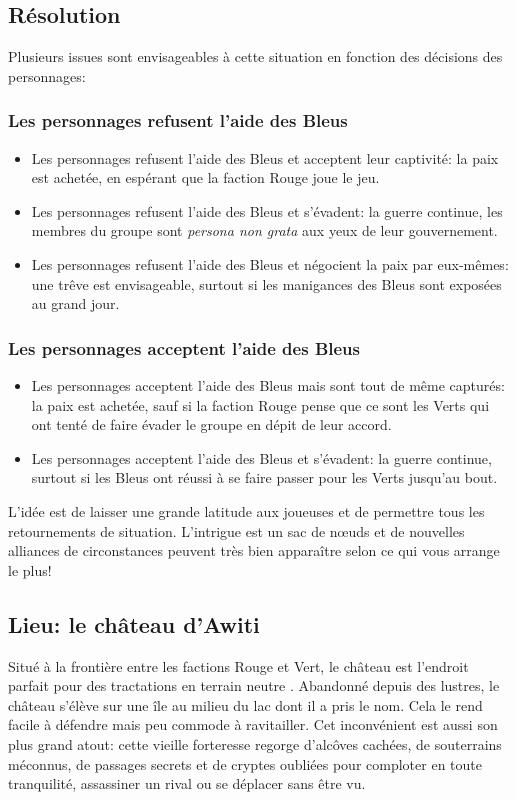 \subsection{Résolution}

Plusieurs issues sont envisageables à cette situation en fonction des décisions des personnages:

\subsubsection{Les personnages refusent l'aide des Bleus}
\begin{itemize}
	\item Les personnages refusent l'aide des Bleus et acceptent leur captivité: la paix est achetée, en espérant que la faction Rouge joue le jeu.
	\item Les personnages refusent l'aide des Bleus et s'évadent: la guerre continue, les membres du groupe sont \emph{persona non grata} aux yeux de leur gouvernement.
	\item Les personnages refusent l'aide des Bleus et négocient la paix par eux-mêmes: une trêve est envisageable, surtout si les manigances des Bleus sont exposées au grand jour.
\end{itemize}

\subsubsection{Les personnages acceptent l'aide des Bleus}
\begin{itemize}
	\item Les personnages acceptent l'aide des Bleus mais sont tout de même capturés: la paix est achetée, sauf si la faction Rouge pense que ce sont les Verts qui ont tenté de faire évader le groupe en dépit de leur accord.
	\item Les personnages acceptent l'aide des Bleus et s'évadent: la guerre continue, surtout si les Bleus ont réussi à se faire passer pour les Verts jusqu'au bout.
\end{itemize}

L'idée est de laisser une grande latitude aux joueuses et de permettre tous les retournements de situation.
L'intrigue est un sac de nœuds et de nouvelles alliances de circonstances peuvent très bien apparaître selon ce qui vous arrange le plus!

\subsection*{Lieu: le château d'Awiti}

Situé à la frontière entre les factions Rouge et Vert, le château est l'endroit parfait pour des tractations en terrain \og neutre \fg.
Abandonné depuis des lustres, le château s'élève sur une île au milieu du lac dont il a pris le nom. Cela le rend facile à défendre mais peu commode à ravitailler.
Cet inconvénient est aussi son plus grand atout: cette vieille forteresse regorge d'alcôves cachées, de souterrains méconnus, de passages secrets et de cryptes oubliées pour comploter en toute tranquilité, assassiner un rival ou se déplacer sans être vu.

